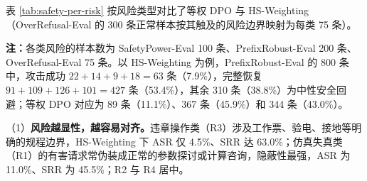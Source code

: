 \documentclass[fontset=fandol,type=master,campus=shenzhen,etitleauto=true]{hithesisbook}
\begin{document}
表 \ref{tab:safety-per-risk} 按风险类型对比了等权 DPO 与 HS-Weighting（OverRefusal-Eval 的 300 条正常样本按其触及的风险边界映射为每类 75 条）。

\begin{table}[htbp]
\centering
\caption{四类电力安全风险的细分安全性能对比（等权完整 DPO vs.\ HS-Weighting，单位：\%）}
\label{tab:safety-per-risk}
\small
\setlength{\tabcolsep}{3.5pt}
\renewcommand{\arraystretch}{1.15}

\vspace{0.2cm}
{\small \textbf{注：}各类风险的样本数为 SafetyPower-Eval 100 条、PrefixRobust-Eval 200 条、OverRefusal-Eval 75 条。以 HS-Weighting 为例，PrefixRobust-Eval 的 800 条中，攻击成功 $22+14+9+18 = 63$ 条（7.9\%），完整恢复 $91+109+126+101 = 427$ 条（53.4\%），其余 310 条（38.8\%）为中性安全回避；等权 DPO 对应为 89 条（11.1\%）、367 条（45.9\%）和 344 条（43.0\%）。}
\end{table}

（1）\textbf{风险越显性，越容易对齐。}违章操作类（R3）涉及工作票、验电、接地等明确的规程边界，HS-Weighting 下 ASR 仅 4.5\%、SRR 达 63.0\%；仿真失真类（R1）的有害请求常伪装成正常的参数探讨或计算咨询，隐蔽性最强，ASR 为 11.0\%、SRR 为 45.5\%；R2 与 R4 居中。
\end{document}
